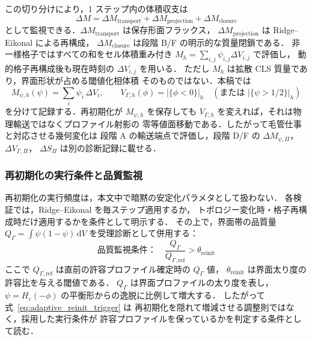 この切り分けにより，1 ステップ内の体積収支は
\begin{equation}
  \Delta M
  =
  \Delta M_{\mathrm{transport}}
  +\Delta M_{\mathrm{projection}}
  +\Delta M_{\mathrm{closure}}
  \label{eq:cls_mass_budget_split}
\end{equation}
として監視できる．$\Delta M_{\mathrm{transport}}$ は保存形面フラックス，
$\Delta M_{\mathrm{projection}}$ は Ridge--Eikonal による再構成，
$\Delta M_{\mathrm{closure}}$ は段階 B/F の明示的な質量閉鎖である．
非一様格子ではすべての和をセル体積重み付き
$M_h=\sum_{i,j}\psi_{i,j}\Delta V_{i,j}$ で評価し，
動的格子再構成後も現在時刻の $\Delta V_{i,j}$ を用いる．
ただし $M_h$ は拡散 CLS 質量であり，界面形状が占める閾値化相体積
そのものではない．本稿では
\begin{equation}
  M_{\psi,h}(\psi)=\sum_i \psi_i\,\Delta V_i,\qquad
  V_{\Gamma,h}(\phi)=|\{\phi<0\}|_h
  \quad(\text{または }|\{\psi>1/2\}|_h)
  \label{eq:diffuse_mass_sharp_volume_split}
\end{equation}
を分けて記録する．再初期化が $M_{\psi,h}$ を保存しても
$V_{\Gamma,h}$ を変えれば，それは物理輸送ではなくプロファイル射影の
零等値面移動である．したがって毛管仕事と対応させる幾何変化は
段階 A の輸送端点で評価し，段階 D/F の
$\Delta M_{\psi,\Pi}$，$\Delta V_{\Gamma,\Pi}$，
$\Delta S_{\Pi}$ は別の診断記録に載せる．


\subsubsection{再初期化の実行条件と品質監視}
\label{sec:adaptive_reinit}

再初期化の実行頻度は，本文中で暗黙の安定化パラメタとして扱わない．
各検証では，Ridge--Eikonal を毎ステップ適用するか，
トポロジー変化時・格子再構成時だけ適用するかを条件として明示する．
その上で，界面帯の品質量
$Q_\Gamma = \int \psi(1-\psi)\,\mathrm{d}V$ を受理診断として併用する：
\begin{equation}
  \text{品質監視条件：}\quad
  \frac{Q_\Gamma}{Q_{\Gamma,\mathrm{ref}}} > \theta_{\mathrm{reinit}}
  \label{eq:adaptive_reinit_trigger}
\end{equation}
ここで $Q_{\Gamma,\mathrm{ref}}$ は直前の許容プロファイル確定時の
$Q_\Gamma$ 値，
$\theta_{\mathrm{reinit}}$ は界面太り度の許容比を与える閾値である．
$Q_\Gamma$ は界面プロファイルの太り度を表し，
$\psi = H_\varepsilon(-\phi)$ の平衡形からの逸脱に比例して増大する．
したがって式~\eqref{eq:adaptive_reinit_trigger} は
再初期化を隠れて増減させる調整則ではなく，採用した実行条件が
許容プロファイルを保っているかを判定する条件として読む．

